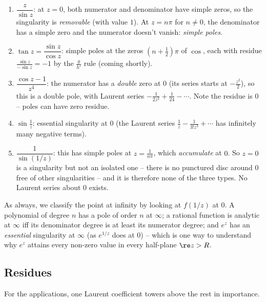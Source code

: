 \begin{example}
	\begin{enumerate}[label=(\roman*)]
		\item $\dfrac{z}{\sin z}$: at $z = 0$, both numerator and denominator have simple zeros, so the singularity is \emph{removable} (with value $1$). At $z = n\pi$ for $n \neq 0$, the denominator has a simple zero and the numerator doesn't vanish: \emph{simple poles}.
		\item $\tan z = \dfrac{\sin z}{\cos z}$: simple poles at the zeros $\left(n + \frac 12\right)\pi$ of $\cos$, each with residue $\frac{\sin z}{-\sin z} = -1$ by the $\frac{g}{h'}$ rule (coming shortly).
		\item $\dfrac{\cos z - 1}{z^4}$: the numerator has a \emph{double} zero at $0$ (its series starts at $-\frac{z^2}{2}$), so this is a double pole, with Laurent series $-\frac{1}{2z^2} + \frac{1}{24} - \cdots$. Note the residue is $0$ -- poles can have zero residue.
		\item $\sin \frac 1z$: essential singularity at $0$ (the Laurent series $\frac 1z - \frac{1}{3! z^3} + \cdots$ has infinitely many negative terms).
		\item $\dfrac{1}{\sin(1/ z)}$: this has simple poles at $z = \frac{1}{n\pi}$, which \emph{accumulate} at $0$. So $z = 0$ is a singularity but not an isolated one -- there is no punctured disc around $0$ free of other singularities -- and it is therefore none of the three types. No Laurent series about $0$ exists.
	\end{enumerate}
\end{example}

\begin{remark}
	As always, we classify the point at infinity by looking at $f(1/z)$ at $0$. A polynomial of degree $n$ has a pole of order $n$ at $\infty$; a rational function is analytic at $\infty$ iff its denominator degree is at least its numerator degree; and $e^z$ has an \emph{essential} singularity at $\infty$ (as $e^{1/z}$ does at $0$) -- which is one way to understand why $e^z$ attains every non-zero value in every half-plane $\re z > R$.
\end{remark}

\subsection{Residues}

For the applications, one Laurent coefficient towers above the rest in importance.


